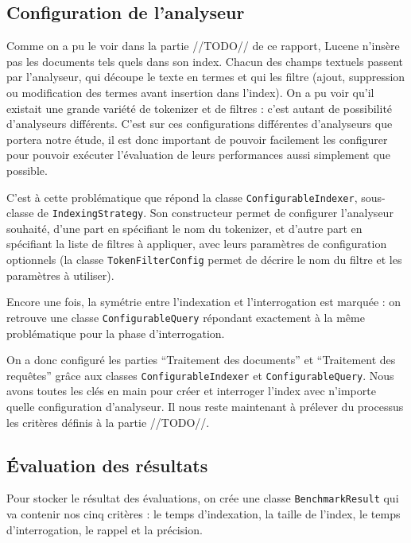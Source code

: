 \subsection{Configuration de l'analyseur}

Comme on a pu le voir dans la partie //TODO// de ce rapport, Lucene n’insère pas les documents tels quels dans son index. Chacun des champs textuels passent par l’analyseur, qui découpe le texte en termes et qui les filtre (ajout, suppression ou modification des termes avant insertion dans l’index). On a pu voir qu’il existait une grande variété de tokenizer et de filtres : c’est autant de possibilité d’analyseurs différents. C’est sur ces configurations différentes d’analyseurs que portera notre étude, il est donc important de pouvoir facilement les configurer pour pouvoir exécuter l’évaluation de leurs performances aussi simplement que possible.

C’est à cette problématique que répond la classe \texttt{ConfigurableIndexer}, sous-classe de \texttt{IndexingStrategy}. Son constructeur permet de configurer l’analyseur souhaité, d’une part en spécifiant le nom du tokenizer, et d’autre part en spécifiant la liste de filtres à appliquer, avec leurs paramètres de configuration optionnels (la classe \texttt{TokenFilterConfig} permet de décrire le nom du filtre et les paramètres à utiliser).

Encore une fois, la symétrie entre l’indexation et l’interrogation est marquée : on retrouve une classe \texttt{ConfigurableQuery} répondant exactement à la même problématique pour la phase d’interrogation.

On a donc configuré les parties “Traitement des documents” et “Traitement des requêtes” grâce aux classes \texttt{ConfigurableIndexer} et \texttt{ConfigurableQuery}. Nous avons toutes les clés en main pour créer et interroger l’index avec n’importe quelle configuration d’analyseur. Il nous reste maintenant à prélever du processus les critères définis à la partie //TODO//.

\subsection{Évaluation des résultats}
\label{section:benchmarkresults}

Pour stocker le résultat des évaluations, on crée une classe \texttt{BenchmarkResult} qui va contenir nos cinq critères : le temps d’indexation, la taille de l’index, le temps d’interrogation, le rappel et la précision.


